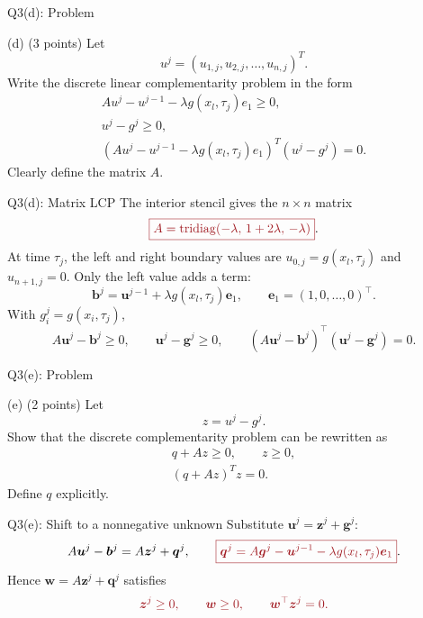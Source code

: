 \documentclass{beamer}
\newcommand{\keymath}[1]{\textcolor{lecturekey}{#1}}
\newcommand{\keybox}[1]{\keymath{\boxed{#1}}}
\begin{document}
\begin{frame}{Q3(d): Problem}
\footnotesize
\setlength{\abovedisplayskip}{5pt}
\setlength{\belowdisplayskip}{5pt}
\begin{block}{(d) \hfill (3 points)}
Let
\[
u^j=(u_{1,j},u_{2,j},\ldots,u_{n,j})^T.
\]
Write the discrete linear complementarity problem in the form
\begin{gather*}
Au^j-u^{j-1}-\lambda g(x_l,\tau_j)e_1\geq0,\\
u^j-g^j\geq0,\\
\left(Au^j-u^{j-1}-\lambda g(x_l,\tau_j)e_1\right)^T
\left(u^j-g^j\right)=0.
\end{gather*}
Clearly define the matrix $A$.
\end{block}
\end{frame}

\begin{frame}{Q3(d): Matrix LCP}
\small
The interior stencil gives the $n\times n$ matrix
\[
\keybox{A=\operatorname{tridiag}(-\lambda,\,1+2\lambda,\,-\lambda)}.
\]
At time $\tau_j$, the left and right boundary values are
$u_{0,j}=g(x_l,\tau_j)$ and $u_{n+1,j}=0$. Only the left value adds a term:
\[
\bm b^j=\bm u^{j-1}+\lambda g(x_l,\tau_j)\bm e_1,
\qquad \bm e_1=(1,0,\ldots,0)^\top.
\]
With $g_i^j=g(x_i,\tau_j)$,
\[
A\bm u^j-\bm b^j\geq0,\qquad \bm u^j-\bm g^j\geq0,\qquad
(A\bm u^j-\bm b^j)^\top(\bm u^j-\bm g^j)=0.
\]
\end{frame}

\begin{frame}{Q3(e): Problem}
\footnotesize
\setlength{\abovedisplayskip}{5pt}
\setlength{\belowdisplayskip}{5pt}
\begin{block}{(e) \hfill (2 points)}
Let
\[
z=u^j-g^j.
\]
Show that the discrete complementarity problem can be rewritten as
\begin{gather*}
q+Az\geq0,\qquad z\geq0,\\
(q+Az)^T z=0.
\end{gather*}
Define $q$ explicitly.
\end{block}
\end{frame}

\begin{frame}{Q3(e): Shift to a nonnegative unknown}
\small
Substitute $\bm u^j=\bm z^j+\bm g^j$:
\[
A\bm u^j-\bm b^j=A\bm z^j+\bm q^j,\qquad
\keybox{\bm q^j=A\bm g^j-\bm u^{j-1}-\lambda g(x_l,\tau_j)\bm e_1}.
\]
Hence $\bm w=A\bm z^j+\bm q^j$ satisfies
\[
\keymath{\bm z^j\geq0,\qquad \bm w\geq0,\qquad \bm w^\top\bm z^j=0.}
\]
\end{frame}
\end{document}
